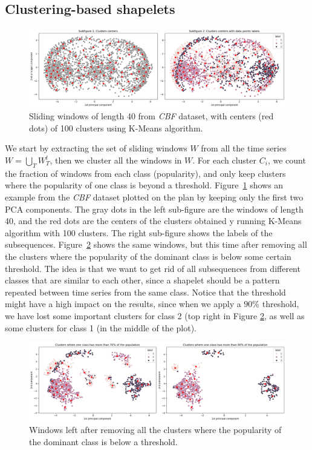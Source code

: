 \documentclass[sigconf, nonacm]{acmart}
\begin{document}
\subsection{Clustering-based shapelets}
\begin{figure}
	\includegraphics[width=\textwidth]{imgs/clustering.png}
	\caption{Sliding windows of length 40 from \emph{CBF} dataset, with centers
		(red dots) of 100 clusters using K-Means algorithm.\label{fig:clustering}}
\end{figure}
We start by extracting the set of sliding windows $W$ from all the time series
$W = \bigcup_T W_T^l$, then we cluster all the windows in $W$.
For each cluster $C_i$, we count the fraction of windows from each class
(popularity), and only keep clusters where the popularity of one class is beyond
a threshold. Figure~\ref{fig:clustering} shows an example from the \emph{CBF}
dataset plotted on the plan by keeping only the first two PCA components. The
gray dots in the left sub-figure are the windows of length 40, and the red dots
are the centers of the clusters obtained y running K-Means algorithm with 100
clusters. The right sub-figure shows the labels of the subsequences.
Figure~\ref{fig:clustering_threshold} shows the same windows, but this time
after removing all the clusters where the popularity of the dominant class is
below some certain threshold.
The idea is that we want to get rid of all subsequences from different classes
that are similar to each other, since a shapelet should be a pattern repeated
between time series from the same class. Notice that the threshold might have a
high impact on the results, since when we apply a $90\%$ threshold, we have lost
some important clusters for class 2 (top right in Figure
\ref{fig:clustering_threshold}, as well as some clusters for class 1 (in the 
middle of the plot).
\begin{figure}
	\includegraphics[width=\textwidth]{imgs/clustering_thresholds.png}
	\caption{Windows left after removing all the clusters where the popularity of
		the dominant class is below a threshold\label{fig:clustering_threshold}.}
\end{figure}
\end{document}
